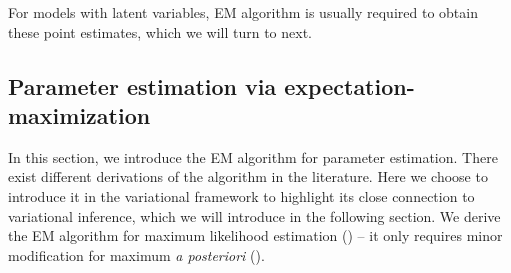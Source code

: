 For models with latent variables, \gls{EM} \citep{dempster1977maximum} algorithm is usually required to obtain these point estimates, which we will turn to next. 

\subsection{Parameter estimation via expectation-maximization}\label{chpt:background:sec:em}

In this section, we introduce the \gls{EM} algorithm for parameter estimation. There exist different derivations of the algorithm in the literature. Here we choose to introduce it in the variational framework to highlight its close connection to variational inference, which we will introduce in the following section. We derive the \gls{EM} algorithm for maximum likelihood estimation () -- it only requires minor modification for maximum \textit{a posteriori} ().

